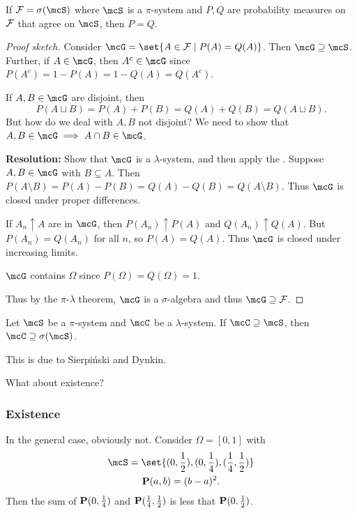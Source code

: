 \begin{theorem} \label{thm:unique}
    If $\F = \sigma(\mcS)$ where $\mcS$ is a $\pi$-system and
    $P, Q$ are probability measures on $\F$ that agree on $\mcS$,
    then $P = Q$.
\end{theorem}
\begin{proof}[Proof sketch]
    Consider $\mcG = \set{A \in \F \mid P(A) = Q(A)}$.
    Then $\mcG \supseteq \mcS$.
    Further, if $A \in \mcG$, then $A^c \in \mcG$
    since $P(A^c) = 1 - P(A) = 1 - Q(A) = Q(A^c)$.

    If $A, B \in \mcG$ are disjoint, then \[
        P(A \sqcup B) = P(A) + P(B) = Q(A) + Q(B) = Q(A \sqcup B).
    \] But how do we deal with $A, B$ not disjoint?
    We need to show that $A, B \in \mcG \implies A \cap B \in \mcG$.

    \textbf{Resolution:} Show that $\mcG$ is a $\lambda$-system,
    and then apply the .
    Suppose $A, B \in \mcG$ with $B \subseteq A$.
    Then $P(A \setminus B) = P(A) - P(B) = Q(A) - Q(B) = Q(A \setminus B)$.
    Thus $\mcG$ is closed under proper differences.

    If $A_n \uparrow A$ are in $\mcG$, then $P(A_n) \uparrow P(A)$ and
    $Q(A_n) \uparrow Q(A)$.
    But $P(A_n) = Q(A_n)$ for all $n$, so $P(A) = Q(A)$.
    Thus $\mcG$ is closed under increasing limits.

    $\mcG$ contains $\Omega$ since $P(\Omega) = Q(\Omega) = 1$.

    Thus by the $\pi$-$\lambda$ theorem, $\mcG$ is a $\sigma$-algebra
    and thus $\mcG \supseteq \F$.
\end{proof}

\begin{theorem*}
\label{thm:pi-lambda}
    Let $\mcS$ be a $\pi$-system and $\mcC$ be a $\lambda$-system.
    If $\mcC \supseteq \mcS$, then $\mcC \supseteq \sigma(\mcS)$.
\end{theorem*}
This is due to Sierpiński and Dynkin.

What about existence?
\subsubsection{Existence}
In the general case, obviously not.
Consider $\Omega = [0, 1]$ with
\begin{gather*}
    \mcS = \set{(0, \frac12), (0, \frac14), (\frac14, \frac12)} \\
    \P(a, b) = (b - a)^2.
\end{gather*} Then the sum of $\P(0, \frac14)$ and $\P(\frac14, \frac12)$ is
less that $\P(0, \frac12)$.

